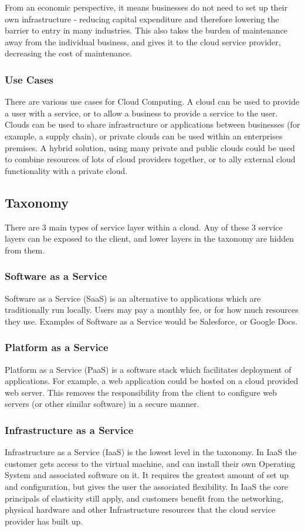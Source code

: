 \documentclass{article}
\begin{document}
From an economic perspective, it means businesses do not need to set up their own infrastructure - reducing capital expenditure and therefore lowering the barrier to entry in many industries. This also takes the burden of maintenance away from the individual business, and gives it to the cloud service provider, decreasing the cost of maintenance. 

\subsubsection{Use Cases}
There are various use cases for Cloud Computing. A cloud can be used to provide a user with a service, or to allow a business to provide a service to the user. Clouds can be used to share infrastructure or applications between businesses (for example, a supply chain), or private clouds can be used within an enterprises premises. A hybrid solution, using many private and public clouds could be used to combine resources of lots of cloud providers together, or to ally external cloud functionality with a private cloud.

\subsection{Taxonomy}
There are 3 main types of service layer within a cloud. Any of these 3 service layers can be exposed to the client, and lower layers in the taxonomy are hidden from them.

\subsubsection{Software as a Service}
Software as a Service (SaaS) is an alternative to applications which are traditionally run locally. Users may pay a monthly fee, or for how much resources they use. Examples of Software as a Service would be Salesforce, or Google Docs.

\subsubsection{Platform as a Service}
Platform as a Service (PaaS) is a software stack which facilitates deployment of applications. For example, a web application could be hosted on a cloud provided web server. This removes the responsibility from the client to configure web servers (or other similar software) in a secure manner.

\subsubsection{Infrastructure as a Service}
Infrastructure as a Service (IaaS) is the lowest level in the taxonomy. In IaaS the customer gets access to the virtual machine, and can install their own Operating System and associated software on it. It requires the greatest amount of set up and configuration, but gives the user the associated flexibility. In IaaS the core principals of elasticity still apply, and customers benefit from the networking, physical hardware and other Infrastructure resources that the cloud service provider has built up. 
\end{document}
